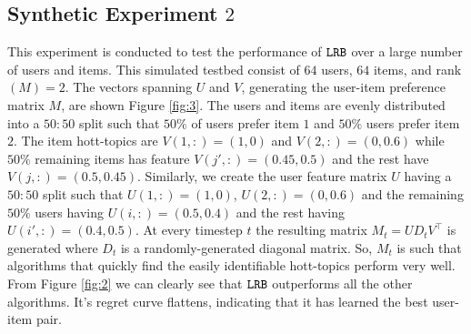 \subsection{Synthetic Experiment $2$}
This experiment is conducted to test the performance of ${\tt LRB}$ over a large number of users and items. This simulated testbed consist of $64$ users, $64$ items, and rank$(M) = 2$. The vectors spanning $U$ and $V$, generating the user-item preference matrix $M$, are shown Figure \ref{fig:3}. The users and items are evenly distributed into a $50:50$ split such that $50\%$ of users prefer item $1$ and $50\%$ users prefer item $2$. The item hott-topics are $V(1,:) = (1,0)$ and $V(2,:) = (0, 0.6)$ while $50\%$ remaining  items has feature $V(j',:) = (0.45, 0.5)$ and the rest have $V(j,:) = (0.5, 0.45)$. Similarly, we create the user feature matrix $U$ having a $50:50$ split such that $U(1,:) = (1,0)$, $U(2,:) = (0,0.6)$ and the remaining $50\%$ users having $U(i,:) = (0.5,0.4)$ and the rest having $U(i',:) = (0.4,0.5)$. At every timestep $t$ the resulting matrix $M_t =UD_tV^{\intercal}$ is generated where $D_t$ is a randomly-generated diagonal matrix. So, $M_t$ is such that algorithms that quickly find the easily identifiable hott-topics perform very well. From Figure \ref{fig:2} we can clearly see that ${\tt LRB}$ outperforms all the other algorithms. It's  regret curve flattens, indicating that it has learned the best user-item pair. 




